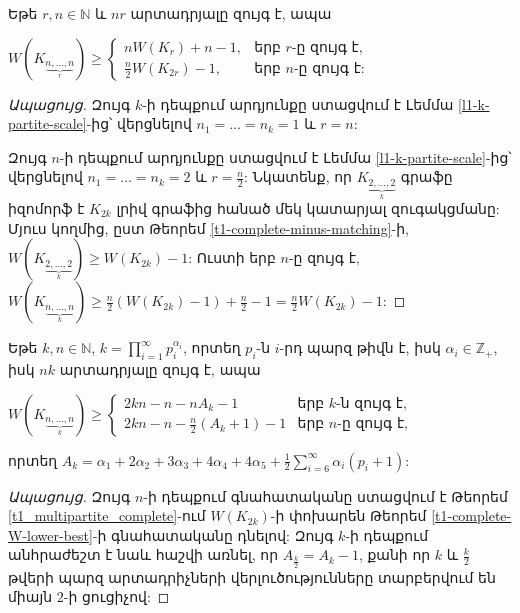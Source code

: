 \begin{theorem}
\label{t1_multipartite_complete}
Եթե $r,n\in \mathbb{N}$ և $nr$ արտադրյալը զույգ է, ապա
\begin{center}
$W\left(K_{\underbrace{\scriptstyle n,\ldots,n}_{r}}\right) \geq 
\left\{\begin{matrix}
 nW(K_r) + n -1, & \text{երբ }r\text{-ը զույգ է,} \\ 
 \frac{n}{2}W(K_{2r}) - 1, &  \text{երբ }n\text{-ը զույգ է:} 
\end{matrix}\right.$
\end{center}
\end{theorem}
\begin{proof}[Ապացույց]
Զույգ $k$-ի դեպքում արդյունքը ստացվում է Լեմմա \ref{l1-k-partite-scale}-ից՝ վերցնելով $n_1=\ldots=n_k=1$ և $r=n$:

Զույգ $n$-ի դեպքում արդյունքը ստացվում է
Լեմմա \ref{l1-k-partite-scale}-ից՝ վերցնելով $n_1=\ldots=n_k=2$ և $r=\frac{n}{2}$: Նկատենք, որ $K_{\underbrace{\scriptstyle 2,\ldots,2}_{k}}$ գրաֆը իզոմորֆ է $K_{2k}$ լրիվ գրաֆից հանած մեկ կատարյալ զուգակցմանը: Մյուս կողմից, ըստ Թեորեմ \ref{t1-complete-minus-matching}-ի, $W(K_{\underbrace{\scriptstyle 2,\ldots,2}_{k}}) \geq W(K_{2k})-1$: Ուստի երբ $n$-ը զույգ է, $W(K_{\underbrace{\scriptstyle n,\ldots,n}_{k}}) \geq \frac{n}{2}\left(W(K_{2k})-1\right) + \frac{n}{2} -1 =  \frac{n}{2}W(K_{2k})-1$:
\end{proof}

\begin{hide}
\begin{corollary}
Եթե $k,n\in \mathbb{N}$, $k=\prod\limits_{i=1}^{\infty}{p_i^{\alpha_i}}$, որտեղ $p_i$-ն $i$-րդ պարզ թիվն է, իսկ $\alpha_i \in \mathbb{Z}_+$, իսկ $nk$ արտադրյալը զույգ է, ապա
\begin{center}
$W\left(K_{\underbrace{\scriptstyle n,\ldots,n}_{k}}\right) \geq 
\left\{\begin{matrix}
 2kn - n - nA_k - 1 & \text{երբ }k\text{-ն զույգ է,} \\ 
 2kn - n - \frac{n}{2}\left(A_k+1\right) - 1 &  \text{երբ }n\text{-ը զույգ է,} 
\end{matrix}\right.$
\end{center}
որտեղ $A_k = \alpha_1 + 2\alpha_2 + 3\alpha_3 + 4\alpha_4 + 4\alpha_5 + \frac{1}{2}\sum\limits_{i=6}^{\infty}{\alpha_i(p_i+1)}$:
\end{corollary}
\begin{proof}[Ապացույց]
Զույգ $n$-ի դեպքում գնահատականը ստացվում է Թեորեմ \ref{t1_multipartite_complete}-ում $W(K_{2k})$-ի փոխարեն Թեորեմ \ref{t1-complete-W-lower-best}-ի գնահատականը դնելով: Զույգ $k$-ի դեպքում անհրաժեշտ է նաև հաշվի առնել, որ $A_{\frac{k}{2}} = A_k - 1$, քանի որ $k$ և $\frac{k}{2}$ թվերի պարզ արտադրիչների վերլուծությունները տարբերվում են միայն $2$-ի ցուցիչով:
\end{proof}
\end{hide}